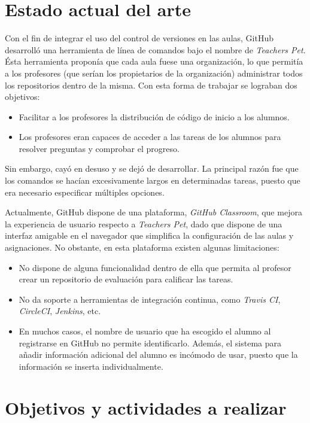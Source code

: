 \section{Estado actual del arte}
\label{1:sec:2}
Con el fin de integrar el uso del control de versiones en las aulas, GitHub desarrolló una herramienta de línea de comandos bajo el nombre de {\it Teachers Pet}. Ésta herramienta proponía que cada aula fuese una
organización, lo que permitía a los profesores (que serían los propietarios de la organización) administrar todos los repositorios dentro de la misma. Con esta forma de trabajar se lograban dos objetivos:
\begin{itemize}
  \item Facilitar a los profesores la distribución de código de inicio a los alumnos.
  \item Los profesores eran capaces de acceder a las tareas de los alumnos para resolver preguntas y comprobar el progreso.
\end{itemize}
Sin embargo, cayó en desuso y se dejó de desarrollar. La principal razón fue que los comandos se hacían excesivamente largos en determinadas tareas, puesto que era necesario especificar múltiples opciones.
\bigskip

Actualmente, GitHub dispone de una plataforma, {\it GitHub Classroom}, que mejora la experiencia de usuario respecto a {\it Teachers Pet}, dado que dispone de una interfaz amigable en el navegador que simplifica
la configuración de las aulas y asignaciones. No obstante, en esta plataforma existen algunas limitaciones:
\begin{itemize}
  \item No dispone de alguna funcionalidad dentro de ella que permita al profesor crear un repositorio de evaluación para calificar las tareas.
  \item No da soporte a herramientas de integración continua, como {\it Travis CI}, {\it CircleCI}, {\it Jenkins}, etc.
  \item En muchos casos, el nombre de usuario que ha escogido el alumno al registrarse en GitHub no permite identificarlo. Además, el sistema para añadir información adicional del alumno es incómodo de usar,
  puesto que la información se inserta individualmente.
\end{itemize}
\section{Objetivos y actividades a realizar}
\label{1:sec:3}

